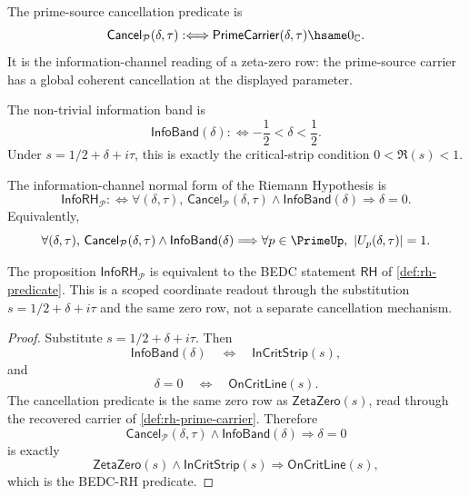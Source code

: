 \begin{definition}
\label{def:rh-prime-source-cancellation}
The prime-source cancellation predicate is
$$
\mathsf{Cancel}_{\mathcal P}(\delta,\tau)
:\Longleftrightarrow
\mathsf{PrimeCarrier}(\delta,\tau)\hsame 0_{\mathbb C}.
$$
It is the information-channel reading of a zeta-zero row: the prime-source
carrier has a global coherent cancellation at the displayed parameter.
\end{definition}

\begin{definition}
\label{def:rh-information-band}
The non-trivial information band is
$$
\mathsf{InfoBand}(\delta)
:\Longleftrightarrow
-\frac{1}{2}<\delta<\frac{1}{2}.
$$
Under $s=1/2+\delta+i\tau$, this is exactly the critical-strip condition
$0<\Re(s)<1$.
\end{definition}

\begin{definition}[Information RH]
\label{def:rh-information-rh}
The information-channel normal form of the Riemann Hypothesis is
$$
\mathsf{InfoRH}_{\mathcal P}
:\Longleftrightarrow
\forall(\delta,\tau),\,
\mathsf{Cancel}_{\mathcal P}(\delta,\tau)
\wedge
\mathsf{InfoBand}(\delta)
\Longrightarrow
\delta=0.
$$
Equivalently,
$$
\forall(\delta,\tau),\,
\mathsf{Cancel}_{\mathcal P}(\delta,\tau)
\wedge
\mathsf{InfoBand}(\delta)
\Longrightarrow
\forall p\in\PrimeUp,\ |U_p(\delta,\tau)|=1.
$$
\end{definition}

\begin{proposition}
\label{prop:rh-information-rh-equivalent}
The proposition $\mathsf{InfoRH}_{\mathcal P}$ is equivalent to the BEDC
statement $\mathsf{RH}$ of \autoref{def:rh-predicate}. This is a scoped
coordinate readout through the substitution $s=1/2+\delta+i\tau$ and the same
zero row, not a separate cancellation mechanism.
\end{proposition}

\begin{proof}
Substitute $s=1/2+\delta+i\tau$.  Then
$$
\mathsf{InfoBand}(\delta)
\quad\Longleftrightarrow\quad
\mathsf{InCritStrip}(s),
$$
and
$$
\delta=0
\quad\Longleftrightarrow\quad
\mathsf{OnCritLine}(s).
$$
The cancellation predicate is the same zero row as
$\mathsf{ZetaZero}(s)$, read through the recovered carrier of
\autoref{def:rh-prime-carrier}.  Therefore
$$
\mathsf{Cancel}_{\mathcal P}(\delta,\tau)
\wedge
\mathsf{InfoBand}(\delta)
\Longrightarrow
\delta=0
$$
is exactly
$$
\mathsf{ZetaZero}(s)\wedge\mathsf{InCritStrip}(s)
\Longrightarrow
\mathsf{OnCritLine}(s),
$$
which is the BEDC-RH predicate.
\end{proof}

